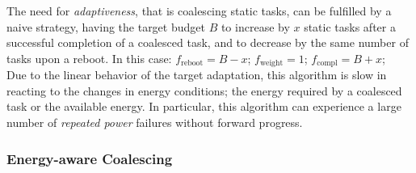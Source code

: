 The need for \emph{adaptiveness}, that is coalescing static tasks, can be fulfilled by a naive strategy, having the target budget $B$ to increase by $x$ static tasks after a successful completion of a coalesced task, and to decrease by the same number of tasks upon a reboot. In this case: $f_\text{reboot} = B - x$; $f_\text{weight} =  1$; $f_\text{compl} = B + x$; \\
Due to the linear behavior of the target adaptation, this algorithm is slow in reacting to the changes in energy conditions; the energy required by a coalesced task or the available energy. In particular, this algorithm can experience a large number of \emph{repeated power} failures without forward progress.

\subsubsection{Energy-aware Coalescing}
\label{subsec:ECoalescing}



































